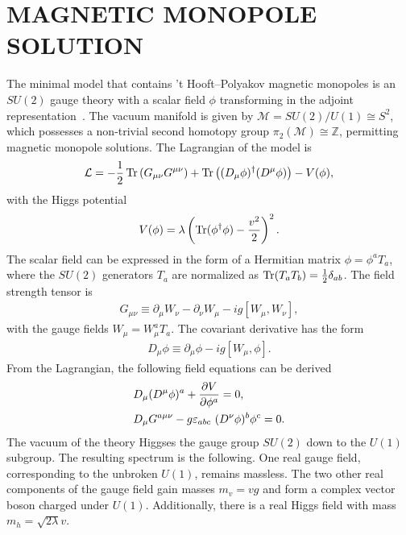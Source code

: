 \documentclass[aps, prd, twocolumn, superscriptaddress, preprintnumbers, nofootinbib, longbibliography]{revtex4-1}
\begin{document}
\section{\MakeUppercase{Magnetic Monopole Solution}}
\label{sec:magnetic-monopole-solution}
The minimal model that contains 't Hooft–Polyakov magnetic monopoles is an $SU(2)$ gauge theory with a scalar field $\phi$ transforming in the adjoint representation~\cite{tHooft:1974kcl, Polyakov:1974ek}. The vacuum manifold is given by $\mathcal{M} = SU(2)/U(1) \cong S^2$, which possesses a non-trivial second homotopy group $\pi_2(\mathcal{M}) \cong \mathbb{Z}$, permitting magnetic monopole solutions.
The Lagrangian of the model is
\begin{align}
    \label{eq:Lagrangian}
  \mathcal{L}=-\frac{1}{2}\Tr\left(G_{\mu\nu}G^{\mu\nu} \right)+\Tr\left((D_\mu\phi)^\dagger (D^\mu\phi) \right)-V(\phi),
\end{align}
with the Higgs potential
\begin{align}
  \label{eq:potential}
  V(\phi)=\lambda\left(\Tr(\phi^\dagger\phi)-\frac{v^2}{2}\right)^2.
\end{align}
The scalar field can be expressed in the form of a 
Hermitian matrix $\phi = \phi^a T_a$, where the $SU(2)$ generators $T_a$ are normalized as  $\Tr(T_a T_b)=\frac{1}{2}\delta_{ab}$.
The field strength tensor is
\begin{align}
  G_{\mu\nu}\equiv\partial_{\mu}W_{\nu}-\partial_{\nu}W_{\mu}-ig \left[ W_\mu, W_\nu \right],
\end{align}
with the gauge fields $W_\mu= W^a_\mu T_a$.
The covariant derivative has the form 
\begin{align}
  D_{\mu}\phi\equiv\partial_{\mu}\phi-ig\left[ W_\mu,\phi \right].
\end{align}
From the Lagrangian, the following field equations can be derived
\begin{align}
\label{eq:field-equations}
  &D_{\mu}(D^\mu\phi)^a+ \pdv{V}{\phi^a}=0,\nonumber\\
  &D_{\mu}G^{a\mu\nu}-g\varepsilon_{abc}\ (D^\nu \phi)^b \phi^c=0.
\end{align}
The vacuum of the theory Higgses the gauge group $SU(2)$ down to the $U(1)$ subgroup. The resulting spectrum %
is the following. 
One real gauge field, corresponding to the unbroken $U(1)$, remains massless. The two other real components of the gauge field gain masses $m_v = v g$
and form a complex vector boson charged under $U(1)$. Additionally, there is a real Higgs field with mass $m_h = \sqrt{2\lambda} v$.
\end{document}
